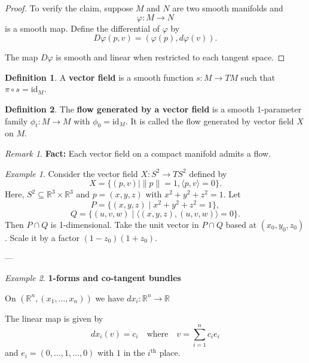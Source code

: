\documentclass[11pt]{article}
\theoremstyle{definition}
\newtheorem{definition}{Definition}[section]
\theoremstyle{remark}
\newtheorem{remark}{Remark}[section]
\newtheorem{example}{Example}[section]
\begin{document}
\begin{proof}
To verify the claim, suppose $M$ and $N$ are two smooth manifolds and
\[
\varphi : M \to N
\]
is a smooth map. Define the differential of $\varphi$ by
\[
D\varphi(p,v) = (\varphi(p), d\varphi(v)).
\]

The map $D\varphi$ is smooth and linear when restricted to each tangent space.
\end{proof}

\begin{definition}\label{def:vector_field}
A \textbf{vector field} is a smooth function $s \colon M \to TM$ such that $\pi \circ s = \mathrm{id}_M$.
\end{definition}

\begin{definition}\label{def:flow_generated_by_vector_field}
The \textbf{flow generated by a vector field} is a smooth 1-parameter family $\phi_t \colon M \to M$ with $\phi_0 = \mathrm{id}_M$. It is called the flow generated by vector field $X$ on $M$.
\end{definition}

\begin{remark}\label{rem:flow_existence}
\textbf{Fact:} Each vector field on a compact manifold admits a flow.
\end{remark}

\begin{example}\label{ex:vector_field_on_sphere}
Consider the vector field $X \colon S^2 \to TS^2$ defined by
\[
X = \{(p, v) \mid \|p\| = 1, \langle p, v \rangle = 0\}.
\]
Here, $S^2 \subseteq \mathbb{R}^3 \times \mathbb{R}^3$ and $p = (x, y, z)$ with $x^2 + y^2 + z^2 = 1$. Let
\[
P = \{(x, y, z) \mid x^2 + y^2 + z^2 = 1\},
\]
\[
Q = \{(u, v, w) \mid \langle (x, y, z), (u, v, w) \rangle = 0\}.
\]
Then $P \cap Q$ is 1-dimensional. Take the unit vector in $P \cap Q$ based at $(x_0, y_0, z_0)$. Scale it by a factor $(1 - z_0)(1 + z_0)$.
\end{example}

---

\begin{example}\label{ex:cotangent_bundle}
\textbf{1-forms and co-tangent bundles}

On $(\mathbb{R}^n, (x_1, \dots, x_n))$ we have $d x_i : \mathbb{R}^n \to \mathbb{R}$

The linear map is given by
\[
d x_i (v) = c_i \quad \text{where} \quad v = \sum_{i=1}^n c_i e_i
\]
and $e_i = (0, \dots, 1, \dots, 0)$ with $1$ in the $i^{\text{th}}$ place.
\end{example}
\end{document}
